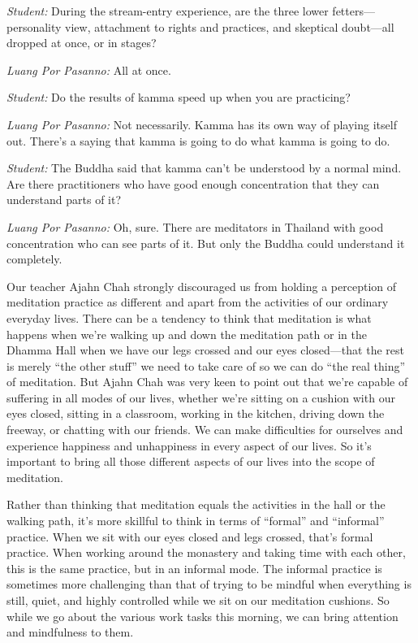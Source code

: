 \emph{Student:} During the stream-entry experience, are the three lower 
fetters---personality view, attachment to rights and practices, and 
skeptical doubt---all dropped at once, or in stages?

\emph{Luang Por Pasanno:} All at once.

\emph{Student:} Do the results of kamma speed up when you are 
practicing?

\emph{Luang Por Pasanno:} Not necessarily. Kamma has its own way of 
playing itself out. There's a saying that kamma is going to do what 
kamma is going to do.

\emph{Student:} The Buddha said that kamma can't be understood by a 
normal mind. Are there practitioners who have good enough concentration 
that they can understand parts of it?

\emph{Luang Por Pasanno:} Oh, sure. There are meditators in Thailand 
with good concentration who can see parts of it. But only the Buddha 
could understand it completely.


Our teacher Ajahn Chah strongly discouraged us from holding a 
perception of meditation practice as different and apart from the 
activities of our ordinary everyday lives. There can be a tendency to 
think that meditation is what happens when we're walking up and down 
the meditation path or in the Dhamma Hall when we have our legs crossed 
and our eyes closed---that the rest is merely ``the other stuff'' we 
need to take care of so we can do ``the real thing'' of meditation. But 
Ajahn Chah was very keen to point out that we're capable of suffering 
in all modes of our lives, whether we're sitting on a cushion with our 
eyes closed, sitting in a classroom, working in the kitchen, driving 
down the freeway, or chatting with our friends. We can make 
difficulties for ourselves and experience happiness and unhappiness in 
every aspect of our lives. So it's important to bring all those 
different aspects of our lives into the scope of meditation.

Rather than thinking that meditation equals the activities in the hall 
or the walking path, it's more skillful to think in terms of ``formal'' 
and ``informal'' practice. When we sit with our eyes closed and legs 
crossed, that's formal practice. When working around the monastery and 
taking time with each other, this is the same practice, but in an 
informal mode. The informal practice is sometimes more challenging than 
that of trying to be mindful when everything is still, quiet, and 
highly controlled while we sit on our meditation cushions. So while we 
go about the various work tasks this morning, we can bring attention 
and mindfulness to them.

